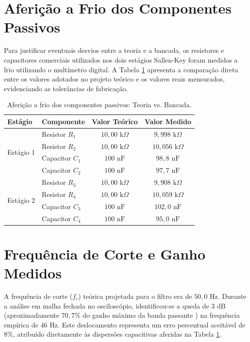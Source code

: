 \section{Aferição a Frio dos Componentes Passivos}

Para justificar eventuais desvios entre a teoria e a bancada, os resistores e capacitores comerciais utilizados nos dois estágios Sallen-Key foram medidos a frio utilizando o multímetro digital. A Tabela \ref{tab:afericao_frio} apresenta a comparação direta entre os valores adotados no projeto teórico e os valores reais mensurados, evidenciando as tolerâncias de fabricação.

\begin{table}[htbp]
	\centering
	\caption{Aferição a frio dos componentes passivos: Teoria vs. Bancada.}
	\label{tab:afericao_frio}
	\begin{tabular}{llcc}
		\toprule
		\textbf{Estágio} & \textbf{Componente} & \textbf{Valor Teórico} & \textbf{Valor Medido} \\
		\midrule
		\multirow{4}{*}{Estágio 1} 
		& Resistor $R_1$ & $10,00\text{ k}\Omega$ & $9,998\text{ k}\Omega$ \\
		& Resistor $R_2$ & $10,00\text{ k}\Omega$ & $10,056\text{ k}\Omega$ \\
		& Capacitor $C_1$ & $100\text{ nF}$ & $98,8\text{ nF}$ \\
		& Capacitor $C_2$ & $100\text{ nF}$ & $97,7\text{ nF}$ \\
		\midrule
		\multirow{4}{*}{Estágio 2} 
		& Resistor $R_3$ & $10,00\text{ k}\Omega$ & $9,908\text{ k}\Omega$ \\
		& Resistor $R_4$ & $10,00\text{ k}\Omega$ & $10,059\text{ k}\Omega$ \\
		& Capacitor $C_3$ & $100\text{ nF}$ & $102,0\text{ nF}$ \\
		& Capacitor $C_4$ & $100\text{ nF}$ & $95,0\text{ nF}$ \\
		\bottomrule
	\end{tabular}
\end{table}

\section{Frequência de Corte e Ganho Medidos}

A frequência de corte ($f_c$) teórica projetada para o filtro era de $50,0\text{ Hz}$. Durante a análise em malha fechada no osciloscópio, identificou-se a queda de $3\text{ dB}$ (aproximadamente $70,7\%$ do ganho máximo da banda passante \cite{nilsson}) na frequência empírica de $46\text{ Hz}$. Este deslocamento representa um erro percentual aceitável de $8\%$, atribuído diretamente às dispersões capacitivas aferidas na Tabela \ref{tab:afericao_frio}.

